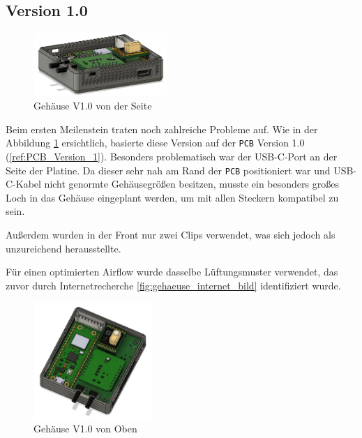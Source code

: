 \begin{inhalt}
\clearpage

\section{Version 1.0}
\label{ref:gehaeuse_1_0}

\begin{figure}[!htb]
\centering
\includegraphics[width=0.45\textwidth]{files/Thomas/pics/geheause/1.0/gehaeuse_side.png}
\caption[Gehäuse V1.0 von der Seite]{Gehäuse V1.0 von der Seite}
\label{fig:gehaeuse_side_v1_0}
\end{figure}

Beim ersten Meilenstein traten noch zahlreiche Probleme auf. Wie in der Abbildung \ref{fig:gehaeuse_side_v1_0} ersichtlich, basierte diese Version auf der \texttt{PCB} Version 1.0 (\ref{ref:PCB_Version_1}).  
Besonders problematisch war der USB-C-Port an der Seite der Platine. Da dieser sehr nah am Rand der \texttt{PCB} positioniert war und USB-C-Kabel nicht genormte Gehäusegrößen besitzen,  
musste ein besonders großes Loch in das Gehäuse eingeplant werden, um mit allen Steckern kompatibel zu sein.  

\vspace{0.15cm}

Außerdem wurden in der Front nur zwei Clips verwendet, was sich jedoch als unzureichend herausstellte.  


\vspace{0.15cm}

Für einen optimierten Airflow wurde dasselbe Lüftungsmuster verwendet, das zuvor durch Internetrecherche \ref{fig:gehaeuse_internet_bild} identifiziert wurde.



\begin{figure}[!htb]
\centering
\includegraphics[width=0.4\textwidth]{files/Thomas/pics/geheause/1.0/gehaeuse_top.png}
\caption[Gehäuse V1.0 von Oben]{Gehäuse V1.0 von Oben}
\label{fig:gehaeuse_top_1_0}
\end{figure}



\end{inhalt}
